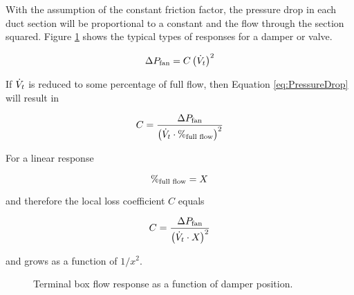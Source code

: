 With the assumption of the constant friction factor, the pressure drop in each duct section will be proportional to a constant and the flow through the section squared. Figure \ref{fig:flowVersusDamperPos} shows the typical types of responses for a damper or valve.

\begin{equation}\label{eq:PressureDrop}
    \Delta P_{\text{fan}} = C\left(\dot{V}_{t}\right)^2
\end{equation}

 If \(\dot{V}_{t}\) is reduced to some percentage of full flow, then Equation \ref{eq:PressureDrop} will result in

 \begin{equation}
     C = \frac{\Delta P_{\text{fan}}}{\left( \dot{V}_{t} \cdot \%_{\text{full flow}} \right)^2}
 \end{equation}
 
For a linear response

\begin{equation}
    \%_{\text{full flow}} = X_{}
\end{equation}

and therefore the local loss coefficient \(C\) equals


\begin{equation}
C = \frac{\Delta P_{\text{fan}}}{\left( \dot{V}_{t} \cdot X_{}  \right)^2}
\end{equation}

and grows as a function of \(1/x^2\). 





\begin{figure}
\centering
{}
\caption{Terminal box flow response as a function of damper position.}
\label{fig:flowVersusDamperPos}
\end{figure}


